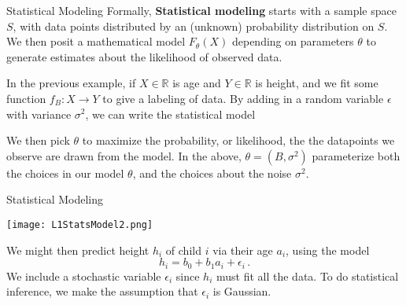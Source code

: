 \documentclass[10pt, handout]{beamer}
\begin{document}
\begin{frame}[fragile]{Statistical Modeling}
Formally, \textbf{Statistical modeling} starts with a sample space $S$, with data points distributed by an (unknown) probability distribution on $S$. We then posit a mathematical model $F_\theta(X)$ depending on parameters $\theta$ to generate estimates about the likelihood of observed data. \pause

In the previous example, if $X\in \mathbb{R}$ is age and $Y\in \mathbb{R}$ is height, and we fit some function $f_B:X\to Y$ to give a labeling of data. By adding in a random variable $\epsilon$ with variance $\sigma^2$, we can write the  statistical model

\begin{center}
\end{center}
We then pick $\theta$ to maximize the probability, or likelihood, the the datapoints we observe are drawn from the model. In the above, $\theta = (B, \sigma^2)$ parameterize both the choices in our model $\theta$, and the choices about the noise $\sigma^2$. 
\end{frame}





\begin{frame}[t]{Statistical Modeling}
  \begin{minipage}[t][0.5\textheight][t]{\textwidth}
    \centering
     \texttt{[image: L1StatsModel2.png]}
  \end{minipage}
  \vfill
  \begin{minipage}[t][0.5\textheight][t]{\textwidth}
We might then predict height $h_i$ of child $i$ via their age $a_i$, using the model
$$
h_i = b_0 + b_1 a_i + \epsilon_i\,.
$$
We include a stochastic variable $\epsilon_i$ since $h_i$ must fit all the data. To do statistical inference, we make the assumption that $\epsilon_i$ is Gaussian. 
  \end{minipage}
\end{frame}
\end{document}
